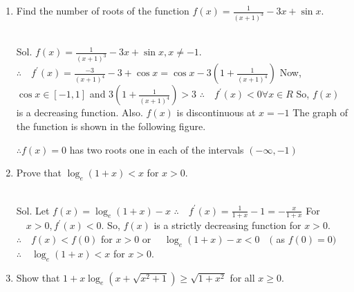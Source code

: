 \begin{enumerate}
    \item 
Find the number of roots of the function $f(x)=\frac{1}{(x+1)^3}-3 x+\sin x$.\\\\

\begin{outline}
   Sol. $f(x)=\frac{1}{(x+1)^3}-3 x+\sin x, x \neq-1$. $\therefore \quad f^{\prime}(x)=\frac{-3}{(x+1)^4}-3+\cos x=\cos x-3\left(1+\frac{1}{(x+1)^4}\right)$
Now, $\cos x \in[-1,1]$ and $3\left(1+\frac{1}{(x+1)^4}\right)>3$
$\therefore \quad f^{\prime}(x)<0 \forall x \in R$
So, $f(x)$ is a decreasing function.
Also. $f(x)$ is discontinuous at $x=-1$
The graph of the function is shown in the following figure.





$\therefore f(x)=0$ has two roots one in each of the intervals $(-\infty,-1)$ 
\end{outline}


\item Prove that $\log _e(1+x)<x$ for $x>0$.\\\\

\begin{outline}
    Sol. Let $f(x)=\log _e(1+x)-x$
$\therefore \quad f^{\prime}(x)=\frac{1}{1+x}-1=-\frac{x}{1+x}$
For $\quad x>0, f^{\prime}(x)<0$.
So, $f(x)$ is a strictly decreasing function for $x>0$.
$\therefore \quad f(x)<f(0)$ for $x>0$
or $\quad \log _e(1+x)-x<0 \quad($ as $f(0)=0)$
$\therefore \quad \log _e(1+x)<x$ for $x>0$.
\end{outline}

\item 
Show that $1+x \log _e\left(x+\sqrt{x^2+1}\right) \geq \sqrt{1+x^2}$ for all $x \geq 0$.\\\\


\end{enumerate}
